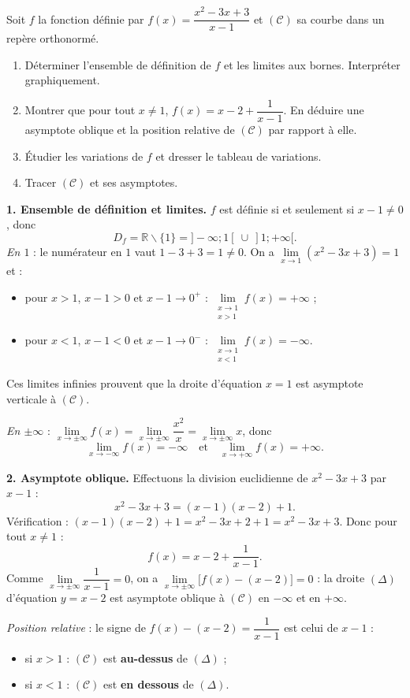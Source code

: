 \documentclass[11pt]{article}
\newcommand{\cle}[1]{{\popxbold\color{popdark}#1}}
\def\setminus{\mathbin{\backslash}}\let\smallsetminus\setminus
\begin{document}
\begin{exoresolu}[Étude de $f(x)=\dfrac{x^2-3x+3}{x-1}$ (type Bac A)]
Soit $f$ la fonction définie par $f(x)=\dfrac{x^2-3x+3}{x-1}$ et $(\mathcal{C})$ sa courbe dans un repère orthonormé.
\begin{enumerate}
\item Déterminer l'ensemble de définition de $f$ et les limites aux bornes. Interpréter graphiquement.
\item Montrer que pour tout $x\neq 1$, $f(x)=x-2+\dfrac{1}{x-1}$. En déduire une asymptote oblique et la position relative de $(\mathcal{C})$ par rapport à elle.
\item Étudier les variations de $f$ et dresser le tableau de variations.
\item Tracer $(\mathcal{C})$ et ses asymptotes.
\end{enumerate}
\tcblower
\textbf{1. Ensemble de définition et limites.} $f$ est définie si et seulement si $x-1\neq 0$, donc
\[
D_f=\mathbb{R}\setminus\{1\}=]-\infty;1[\ \cup\ ]1;+\infty[.
\]
\emph{En $1$} : le numérateur en $1$ vaut $1-3+3=1\neq 0$. On a $\lim\limits_{x\to 1}(x^2-3x+3)=1$ et :
\begin{itemize}
\item pour $x>1$, $x-1>0$ et $x-1\to 0^+$ : $\lim\limits_{\substack{x\to 1\\x>1}} f(x)=+\infty$ ;
\item pour $x<1$, $x-1<0$ et $x-1\to 0^-$ : $\lim\limits_{\substack{x\to 1\\x<1}} f(x)=-\infty$.
\end{itemize}
Ces limites infinies prouvent que la droite d'équation $x=1$ est \cle{asymptote verticale} à $(\mathcal{C})$.

\emph{En $\pm\infty$} : $\lim\limits_{x\to\pm\infty} f(x)=\lim\limits_{x\to\pm\infty}\dfrac{x^2}{x}=\lim\limits_{x\to\pm\infty} x$, donc
\[
\lim_{x\to -\infty} f(x)=-\infty \quad\text{et}\quad \lim_{x\to +\infty} f(x)=+\infty.
\]

\textbf{2. Asymptote oblique.} Effectuons la division euclidienne de $x^2-3x+3$ par $x-1$ :
\[
x^2-3x+3=(x-1)(x-2)+1.
\]
Vérification : $(x-1)(x-2)+1=x^2-3x+2+1=x^2-3x+3$. Donc pour tout $x\neq 1$ :
\[
f(x)=x-2+\frac{1}{x-1}.
\]
Comme $\lim\limits_{x\to\pm\infty}\dfrac{1}{x-1}=0$, on a $\lim\limits_{x\to\pm\infty}\big[f(x)-(x-2)\big]=0$ : la droite $(\Delta)$ d'équation $y=x-2$ est \cle{asymptote oblique} à $(\mathcal{C})$ en $-\infty$ et en $+\infty$.

\emph{Position relative} : le signe de $f(x)-(x-2)=\dfrac{1}{x-1}$ est celui de $x-1$ :
\begin{itemize}
\item si $x>1$ : $(\mathcal{C})$ est \textbf{au-dessus} de $(\Delta)$ ;
\item si $x<1$ : $(\mathcal{C})$ est \textbf{en dessous} de $(\Delta)$.
\end{itemize}


\end{exoresolu}
\end{document}
